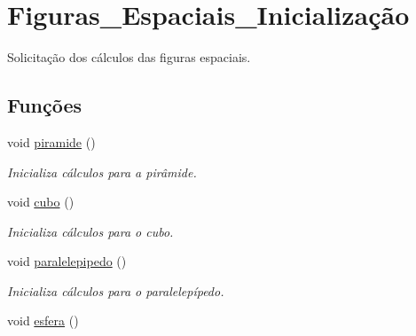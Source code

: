 \hypertarget{group__Figuras__Espaciais__Inicializa_xC3_xA7_xC3_xA3o}{}\section{Figuras\+\_\+\+Espaciais\+\_\+\+Inicialização}
\label{group__Figuras__Espaciais__Inicializa_xC3_xA7_xC3_xA3o}


Solicitação dos cálculos das figuras espaciais.  


\subsection*{Funções}
\begin{DoxyCompactItemize}
\item 
void \hyperlink{group__Figuras__Espaciais__Inicializa_xC3_xA7_xC3_xA3o_gae3945922f925bc3d1fd95c5dc4ff6987}{piramide} ()\hypertarget{group__Figuras__Espaciais__Inicializa_xC3_xA7_xC3_xA3o_gae3945922f925bc3d1fd95c5dc4ff6987}{}\label{group__Figuras__Espaciais__Inicializa_xC3_xA7_xC3_xA3o_gae3945922f925bc3d1fd95c5dc4ff6987}

\begin{DoxyCompactList}\small\item\em Inicializa cálculos para a pirâmide. \end{DoxyCompactList}\item 
void \hyperlink{group__Figuras__Espaciais__Inicializa_xC3_xA7_xC3_xA3o_gaf0b7d023166ce6902197d4082a66ad03}{cubo} ()\hypertarget{group__Figuras__Espaciais__Inicializa_xC3_xA7_xC3_xA3o_gaf0b7d023166ce6902197d4082a66ad03}{}\label{group__Figuras__Espaciais__Inicializa_xC3_xA7_xC3_xA3o_gaf0b7d023166ce6902197d4082a66ad03}

\begin{DoxyCompactList}\small\item\em Inicializa cálculos para o cubo. \end{DoxyCompactList}\item 
void \hyperlink{group__Figuras__Espaciais__Inicializa_xC3_xA7_xC3_xA3o_gaf5c3350f35c2d9ae97c0243b7aeac39e}{paralelepipedo} ()\hypertarget{group__Figuras__Espaciais__Inicializa_xC3_xA7_xC3_xA3o_gaf5c3350f35c2d9ae97c0243b7aeac39e}{}\label{group__Figuras__Espaciais__Inicializa_xC3_xA7_xC3_xA3o_gaf5c3350f35c2d9ae97c0243b7aeac39e}

\begin{DoxyCompactList}\small\item\em Inicializa cálculos para o paralelepípedo. \end{DoxyCompactList}\item 
void \hyperlink{group__Figuras__Espaciais__Inicializa_xC3_xA7_xC3_xA3o_ga947bf2f326598c591bbdbf77a0280266}{esfera} ()\hypertarget{group__Figuras__Espaciais__Inicializa_xC3_xA7_xC3_xA3o_ga947bf2f326598c591bbdbf77a0280266}{}\label{group__Figuras__Espaciais__Inicializa_xC3_xA7_xC3_xA3o_ga947bf2f326598c591bbdbf77a0280266}


\end{DoxyCompactItemize}
